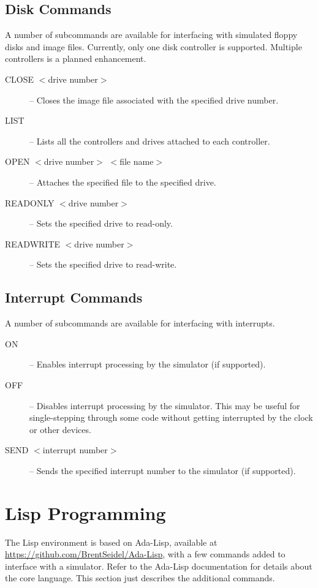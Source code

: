 \documentclass[10pt, openany]{book}
\begin{document}
\subsection{Disk Commands}
A number of subcommands are available for interfacing with simulated floppy disks and image files.  Currently, only one disk controller is supported.  Multiple controllers is a planned enhancement.
\begin{description}
  \item[CLOSE $<$drive number$>$] -- Closes the image file associated with the specified drive number.
  \item[LIST] -- Lists all the controllers and drives attached to each controller.
  \item[OPEN $<$drive number$>$ $<$file name$>$] -- Attaches the specified file to the specified drive.
  \item[READONLY $<$drive number$>$] -- Sets the specified drive to read-only.
  \item[READWRITE $<$drive number$>$] -- Sets the specified drive to read-write.
\end{description}

\subsection{Interrupt Commands}
A number of subcommands are available for interfacing with interrupts.
\begin{description}
  \item[ON] -- Enables interrupt processing by the simulator (if supported).
  \item[OFF] -- Disables interrupt processing by the simulator.  This may be useful for single-stepping through some code without getting interrupted by the clock or other devices.
  \item[SEND $<$interrupt number$>$] --  Sends the specified interrupt number to the simulator (if supported).
\end{description}

\section{Lisp Programming}
The Lisp environment is based on Ada-Lisp, available at \url{https://github.com/BrentSeidel/Ada-Lisp}, with a few commands added to interface with a simulator.  Refer to the Ada-Lisp documentation for details about the core language.  This section just describes the additional commands.
\end{document}

